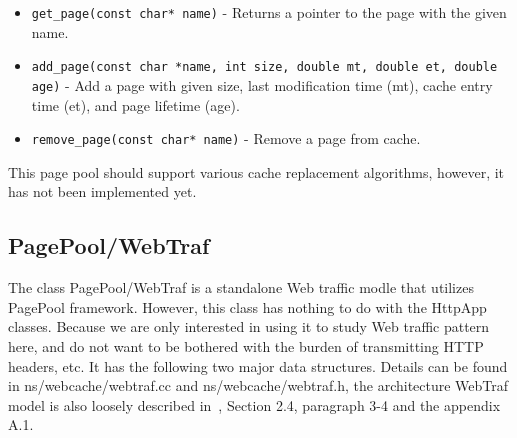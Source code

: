 \begin{itemize}
\item {\tt get\_page(const char* name)} - Returns a pointer to the
  page with the given name. 
\item {\tt add\_page(const char *name, int size, double mt, double et, double age)} - Add a page with given size, last modification
    time (mt), cache entry time (et), and page lifetime (age). 
\item {\tt remove\_page(const char* name)} - Remove a page from cache.
\end{itemize}

This page pool should support various cache replacement algorithms,
however, it has not been implemented yet. 

\subsection{PagePool/WebTraf}

The class PagePool/WebTraf is a standalone Web traffic modle that utilizes
PagePool framework. However, this class has nothing to do with the HttpApp 
classes. Because we are only interested in using it to study Web traffic 
pattern here, and do not want to be bothered with the burden of 
transmitting HTTP headers, etc. It has the following two major data structures.
Details can be found in ns/webcache/webtraf.cc and ns/webcache/webtraf.h, the
architecture WebTraf model is also loosely described in~\cite{Feldmann99a}, 
Section 2.4, paragraph 3-4 and the appendix A.1.

